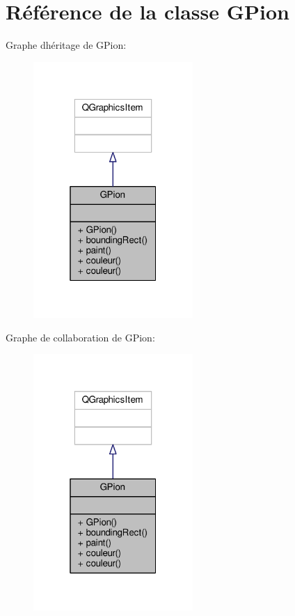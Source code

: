 \hypertarget{classGPion}{}\section{Référence de la classe G\+Pion}
\label{classGPion}


Graphe d\textquotesingle{}héritage de G\+Pion\+:
\nopagebreak
\begin{figure}[H]
\begin{center}
\leavevmode
\includegraphics[width=172pt]{classGPion__inherit__graph}
\end{center}
\end{figure}


Graphe de collaboration de G\+Pion\+:
\nopagebreak
\begin{figure}[H]
\begin{center}
\leavevmode
\includegraphics[width=172pt]{classGPion__coll__graph}
\end{center}
\end{figure}
